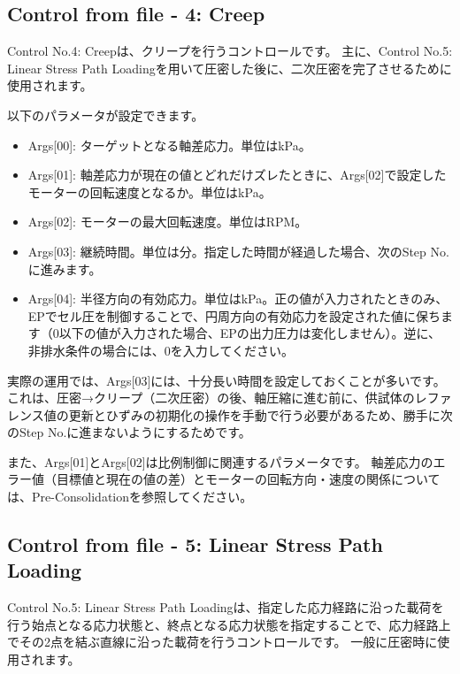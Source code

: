 \subsection{Control from file - 4: Creep}
Control No.4: Creepは、クリープを行うコントロールです。
主に、Control No.5: Linear Stress Path Loadingを用いて圧密した後に、二次圧密を完了させるために使用されます。

以下のパラメータが設定できます。

\begin{itemize}
    \item Args[00]: ターゲットとなる軸差応力。単位はkPa。
    \item Args[01]: 軸差応力が現在の値とどれだけズレたときに、Args[02]で設定したモーターの回転速度となるか。単位はkPa。
    \item Args[02]: モーターの最大回転速度。単位はRPM。
    \item Args[03]: 継続時間。単位は分。指定した時間が経過した場合、次のStep No.に進みます。
    \item Args[04]: 半径方向の有効応力。単位はkPa。正の値が入力されたときのみ、EPでセル圧を制御することで、円周方向の有効応力を設定された値に保ちます（0以下の値が入力された場合、EPの出力圧力は変化しません）。逆に、非排水条件の場合には、0を入力してください。
\end{itemize}
実際の運用では、Args[03]には、十分長い時間を設定しておくことが多いです。これは、圧密→クリープ（二次圧密）の後、軸圧縮に進む前に、供試体のレファレンス値の更新とひずみの初期化の操作を手動で行う必要があるため、勝手に次のStep No.に進まないようにするためです。

また、Args[01]とArgs[02]は比例制御に関連するパラメータです。
軸差応力のエラー値（目標値と現在の値の差）とモーターの回転方向・速度の関係については、Pre-Consolidationを参照してください。

\subsection{Control from file - 5: Linear Stress Path Loading}
Control No.5: Linear Stress Path Loadingは、指定した応力経路に沿った載荷を行う始点となる応力状態と、終点となる応力状態を指定することで、応力経路上でその2点を結ぶ直線に沿った載荷を行うコントロールです。
一般に圧密時に使用されます。

